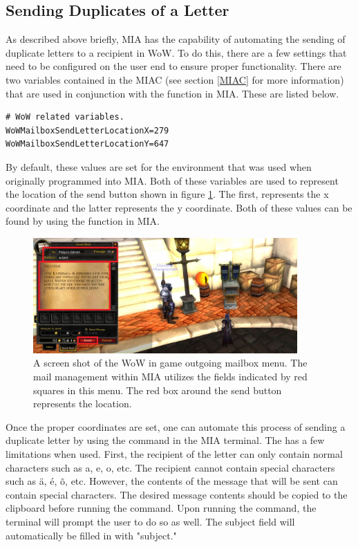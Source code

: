\subsection{Sending Duplicates of a Letter}

As described above briefly, MIA has the capability of automating the sending of duplicate letters to a recipient in WoW. To do this, there are a few settings that need to be configured on the user end to ensure proper functionality. There are two variables contained in the MIAC (see section \ref{MIAC} for more information) that are used in conjunction with the  function in MIA. These are listed below.

\begin{lstlisting}
# WoW related variables.
WoWMailboxSendLetterLocationX=279
WoWMailboxSendLetterLocationY=647
\end{lstlisting}

By default, these values are set for the environment that was used when originally programmed into MIA. Both of these variables are used to represent the location of the send button shown in figure \ref{wow mailbox send}. The first,  represents the x coordinate and the latter  represents the y coordinate. Both of these values can be found by using the  function in MIA. 

\begin{figure}[h]
	\centering
	\includegraphics[width=0.9\textwidth]{Images/WoWScrnShot_040518_181350b.jpg}
	\caption{A screen shot of the WoW in game outgoing mailbox menu. The mail management within MIA utilizes the fields indicated by red squares in this menu. The red box around the send button represents the  location.} \label{wow mailbox send}
\end{figure}

Once the proper coordinates are set, one can automate this process of sending a duplicate letter by using the  command in the MIA terminal. The  has a few limitations when used. First, the recipient of the letter can only contain normal characters such as a, e, o, etc. The recipient cannot contain special characters such as \"{a}, \'{e}, \~{o}, etc. However, the contents of the message that will be sent can contain special characters. The desired message contents should be copied to the clipboard before running the  command. Upon running the command, the terminal will prompt the user to do so as well. The subject field will automatically be filled in with "subject."

